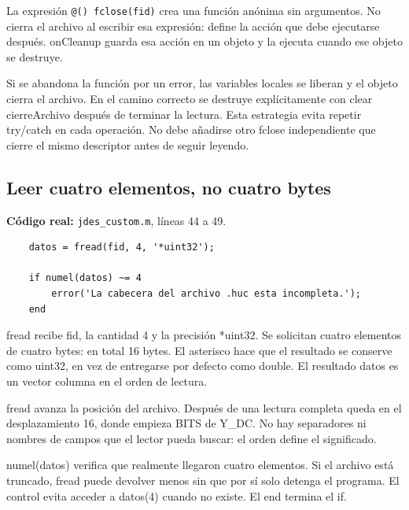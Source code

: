 \documentclass[11pt,a4paper,oneside]{report}
\begin{document}
La expresión \texttt{@() fclose(fid)} crea una función anónima sin argumentos.
No cierra el archivo al escribir esa expresión: define la acción que debe
ejecutarse después. onCleanup guarda esa acción en un objeto y la ejecuta
cuando ese objeto se destruye.

Si se abandona la función por un error, las variables locales se liberan
y el objeto cierra el archivo. En el camino correcto se destruye explícitamente
con clear cierreArchivo después de terminar la lectura. Esta estrategia
evita repetir try/catch en cada operación. No debe añadirse otro fclose
independiente que cierre el mismo descriptor antes de seguir leyendo.


\par\medskip\noindent\begin{minipage}{\linewidth}

\subsection{Leer cuatro elementos, no cuatro bytes}

\textbf{Código real:} \texttt{jdes\_custom.m}, líneas 44 a 49.

\begin{lstlisting}[firstnumber=44]
    % Leer los cuatro valores uint32 de la cabecera.
    datos = fread(fid, 4, '*uint32');

    if numel(datos) ~= 4
        error('La cabecera del archivo .huc esta incompleta.');
    end
\end{lstlisting}

\end{minipage}\par


fread recibe fid, la cantidad 4 y la precisión *uint32. Se solicitan cuatro
elementos de cuatro bytes: en total 16 bytes. El asterisco hace que el
resultado se conserve como uint32, en vez de entregarse por defecto como double.
El resultado datos es un vector columna en el orden de lectura.

fread avanza la posición del archivo. Después de una lectura completa queda
en el desplazamiento 16, donde empieza BITS de Y\_DC. No hay separadores
ni nombres de campos que el lector pueda buscar: el orden define el significado.

numel(datos) verifica que realmente llegaron cuatro elementos. Si el archivo
está truncado, fread puede devolver menos sin que por sí solo detenga el programa.
El control evita acceder a datos(4) cuando no existe. El end termina el if.
\end{document}
